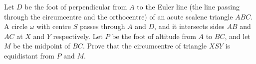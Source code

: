 Let $D$ be the foot of perpendicular from $A$ to the Euler line (the line passing through the circumcentre and the orthocentre) of an acute scalene triangle $ABC$. A circle $\omega$ with centre $S$ passes through $A$ and $D$, and it intersects sides $AB$ and $AC$ at $X$ and $Y$ respectively. Let $P$ be the foot of altitude from $A$ to $BC$, and let $M$ be the midpoint of $BC$. Prove that the circumcentre of triangle $XSY$ is equidistant from $P$ and $M$.
